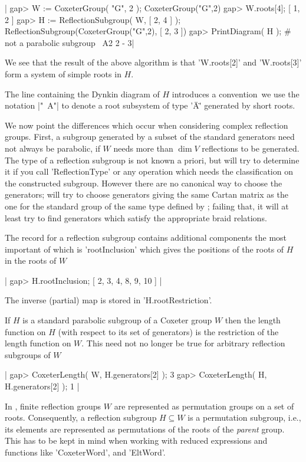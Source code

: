 |    gap> W := CoxeterGroup( "G", 2 );
    CoxeterGroup("G",2)
    gap> W.roots[4];
    [ 1, 2 ]
    gap> H := ReflectionSubgroup( W, [ 2, 4 ] );
    ReflectionSubgroup(CoxeterGroup("G",2), [ 2, 3 ])
    gap> PrintDiagram( H );         # not a parabolic subgroup
    ~A2    2 - 3|

We see that  the result of the above algorithm  is that 'W.roots[2]' and
'W.roots[3]' form a system of simple roots in $H$.

The line containing the Dynkin  diagram of $H$ introduces a convention\:\
we use the  notation |"~A"| to denote a  root  subsystem of type  '\"A\"'
generated by short roots.

We  now  point the  differences  which  occur when  considering  complex
reflection  groups. First,  a  subgroup  generated by  a  subset of  the
standard generators need not always be parabolic, if $W$ needs more than
$\dim V$ reflections to be generated.  The type of a reflection subgroup
is not  known a priori,  but {\CHEVIE} will try  to determine it  if you
call 'ReflectionType' or any operation which needs the classification on
the constructed subgroup.  However there are no canonical  way to choose
the generators; {\CHEVIE} will try  to choose generators giving the same
Cartan matrix as the one for the standard group of the same type defined
by \CHEVIE;  failing that,  it will  at least  try to  find generators
which satisfy the appropriate braid relations.

The record for a reflection  subgroup contains additional components the
most important of which is  'rootInclusion' which gives the positions of
the roots of $H$ in the roots of $W$\:

|    gap> H.rootInclusion;
    [ 2, 3, 4, 8, 9, 10 ] |

The inverse (partial) map is stored  in 'H.rootRestriction'.

If $H$ is a standard parabolic subgroup  of a Coxeter group $W$ then the
length function  on $H$ (with respect  to its set of  generators) is the
restriction of  the length function on  $W$. This need not  no longer be
true for arbitrary reflection subgroups of $W$\:

|    gap> CoxeterLength( W, H.generators[2] );
    3
    gap> CoxeterLength( H, H.generators[2] );
    1 |

In \GAP,  finite reflection  groups $W$  are represented  as permutation
groups  on  a set  of  roots.  Consequently,  a reflection  subgroup  $H
\subseteq  W$  is  a  permutation   subgroup,  i.e.,  its  elements  are
represented as permutations of the roots of the {\it parent} group. This
has  to be  kept  in  mind when  working  with  reduced expressions  and
functions like 'CoxeterWord', and 'EltWord'.

